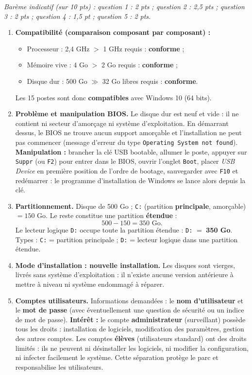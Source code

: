 \documentclass[11pt]{article}
\begin{document}
\begin{corrige}
\emph{Barème indicatif (sur 10 pts) : question 1 : 2 pts ; question 2 : 2,5 pts ; question 3 : 2 pts ; question 4 : 1,5 pt ; question 5 : 2 pts.}
\begin{enumerate}
\item \textbf{Compatibilité (comparaison composant par composant) :}
\begin{itemize}
\item Processeur : 2,4 GHz $>$ 1 GHz requis : \textbf{conforme} ;
\item Mémoire vive : 4 Go $>$ 2 Go requis : \textbf{conforme} ;
\item Disque dur : 500 Go $\gg$ 32 Go libres requis : \textbf{conforme}.
\end{itemize}
Les 15 postes sont donc \textbf{compatibles} avec Windows 10 (64 bits).
\item \textbf{Problème et manipulation BIOS.} Le disque dur est neuf et vide : il ne contient ni secteur d'amorçage ni système d'exploitation. En démarrant dessus, le BIOS ne trouve aucun support amorçable et l'installation ne peut pas commencer (message d'erreur du type \texttt{Operating System not found}). \textbf{Manipulation :} brancher la clé USB bootable, allumer le poste, appuyer sur \texttt{Suppr} (ou \texttt{F2}) pour entrer dans le BIOS, ouvrir l'onglet \texttt{Boot}, placer \emph{USB Device} en première position de l'ordre de bootage, sauvegarder avec \texttt{F10} et redémarrer : le programme d'installation de Windows se lance alors depuis la clé.
\item \textbf{Partitionnement.} Disque de 500 Go ; \texttt{C:} (partition \textbf{principale}, amorçable) $= 150$ Go. Le reste constitue une partition \textbf{étendue} :
\[ 500 - 150 = 350 \text{ Go}. \]
Le lecteur logique \texttt{D:} occupe toute la partition étendue : \texttt{D:} $=$ \textbf{350 Go}. Types : \texttt{C:} = partition principale ; \texttt{D:} = lecteur logique dans une partition étendue.
\item \textbf{Mode d'installation : nouvelle installation.} Les disques sont vierges, livrés sans système d'exploitation : il n'existe aucune version antérieure à mettre à niveau ni système endommagé à réparer.
\item \textbf{Comptes utilisateurs.} Informations demandées : le \textbf{nom d'utilisateur} et le \textbf{mot de passe} (avec éventuellement une question de sécurité ou un indice de mot de passe). \textbf{Intérêt :} le compte \textbf{administrateur} (surveillant) possède tous les droits : installation de logiciels, modification des paramètres, gestion des autres comptes. Les comptes \textbf{élèves} (utilisateurs standard) ont des droits limités : ils ne peuvent ni désinstaller les logiciels, ni modifier la configuration, ni infecter facilement le système. Cette séparation protège le parc et responsabilise les utilisateurs.

\end{enumerate}
\end{corrige}
\end{document}
